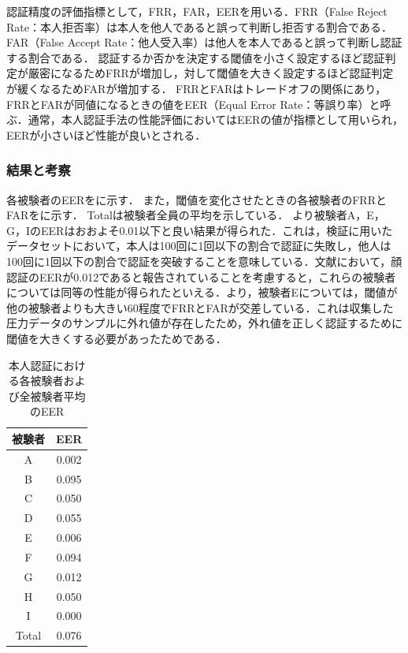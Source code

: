 \documentclass[Japanese,noauthor]{dicomopapers}
\begin{document}
認証精度の評価指標として，FRR，FAR，EERを用いる．FRR（False Reject Rate：本人拒否率）は本人を他人であると誤って判断し拒否する割合である．
FAR（False Accept Rate：他人受入率）は他人を本人であると誤って判断し認証する割合である．
認証するか否かを決定する閾値を小さく設定するほど認証判定が厳密になるためFRRが増加し，対して閾値を大きく設定するほど認証判定が緩くなるためFARが増加する．
FRRとFARはトレードオフの関係にあり，FRRとFARが同値になるときの値をEER（Equal Error Rate：等誤り率）と呼ぶ．通常，本人認証手法の性能評価においてはEERの値が指標として用いられ，EERが小さいほど性能が良いとされる．

\subsubsection{結果と考察}
各被験者のEERをに示す．
また，閾値を変化させたときの各被験者のFRRとFARをに示す．
Totalは被験者全員の平均を示している．
より被験者A，E，G，IのEERはおおよそ0.01以下と良い結果が得られた．これは，検証に用いたデータセットにおいて，本人は100回に1回以下の割合で認証に失敗し，他人は100回に1回以下の割合で認証を突破することを意味している．文献\cite{face_auth}において，顔認証のEERが0.012であると報告されていることを考慮すると，これらの被験者については同等の性能が得られたといえる．より，被験者Eについては，閾値が他の被験者よりも大きい60程度でFRRとFARが交差している．これは収集した圧力データのサンプルに外れ値が存在したため，外れ値を正しく認証するために閾値を大きくする必要があったためである．\par

\begin{table}[!t]
  \centering
  \caption{本人認証における各被験者および全被験者平均のEER}
  \begin{tabular}{c|c} \hline\hline
    被験者 & EER \\ \hline
    A & 0.002 \\
    B & 0.095 \\
    C & 0.050 \\
    D & 0.055 \\
    E & 0.006 \\
    F & 0.094 \\
    G & 0.012 \\
    H & 0.050 \\
    I & 0.000 \\ \hline
    Total & 0.076 \\ \hline
  \end{tabular}
  \label{EER_num}
\end{table}
\end{document}
